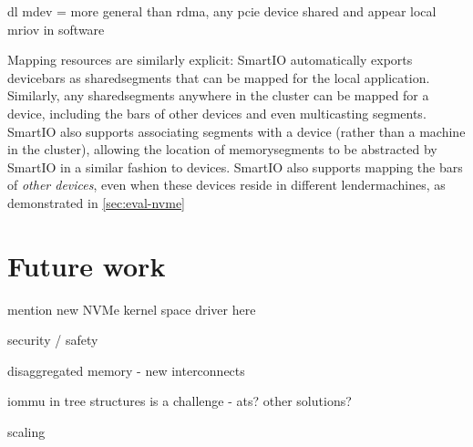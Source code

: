     dl mdev = more general than rdma, any pcie device shared and appear local
mriov in software


        Mapping resources are similarly explicit: SmartIO automatically exports \glspl{devicebar} as \glspl{sharedsegment} that can be mapped for the local application.
        Similarly, any \glspl{sharedsegment} anywhere in the cluster can be mapped for a device, including the \glspl{bar} of other devices and even \gls{multicasting} \glspl{segment}.
        SmartIO also supports associating \glspl{segment} with a device (rather than a machine in the cluster), allowing the location of \glspl{memorysegment} to be abstracted by SmartIO in a similar fashion to devices.
SmartIO also supports mapping the \glspl{bar} of \emph{other devices}, even when these devices reside in different \glspl{lendermachine}, as 
%
demonstrated in \cref{sec:eval-nvme}
%



\section{Future work}\label{sec:fw}

mention new NVMe kernel space driver here

security / safety

disaggregated memory - new interconnects

iommu in tree structures is a challenge - ats? other solutions?


scaling 



%
%
